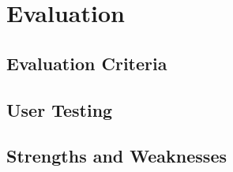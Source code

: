 \newpage
\section{Evaluation}
\subsection{Evaluation Criteria}
\subsection{User Testing}
\subsection{Strengths and Weaknesses}

